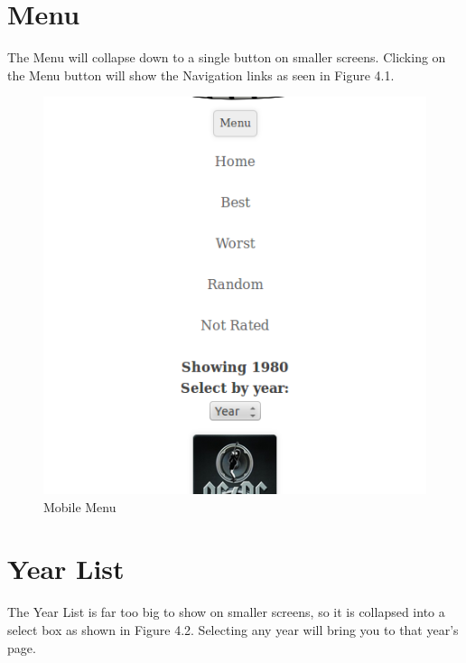 \documentclass[10pt,a4paper]{scrreprt}
\begin{document}
\section{Menu}
The Menu will collapse down to a single button on smaller screens. Clicking on the Menu button will show the Navigation links as seen in Figure 4.1.

\begin{figure}[H]
\centering
\includegraphics[scale=.5]{menu.png}
\caption{Mobile Menu}
\end{figure}

\section{Year List}
The Year List is far too big to show on smaller screens, so it is collapsed into a select box as shown in Figure 4.2. Selecting any year will bring you to that year's page.
\end{document}
